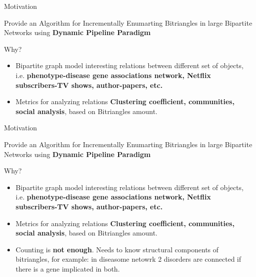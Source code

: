 \begin{frame}[fragile]{Motivation}
  \begin{center}
    Provide an Algorithm for Incrementally Enumarting Bitriangles in large Bipartite Networks using \textbf{Dynamic Pipeline Paradigm}
  \end{center}    
  \begin{block}{Why?}
    \begin{itemize}
      \item {\color{light}Bipartite graph model interesting relations between different set of objects, i.e. \textbf{phenotype-disease gene associations network, Netflix subscribers-TV shows, author-papers, etc.}}
      \item Metrics for analyzing relations \textbf{Clustering coefficient, communities, social analysis}, based on Bitriangles amount.
    \end{itemize}
  \end{block}
\end{frame}

\begin{frame}[fragile]{Motivation}
  \begin{center}
    Provide an Algorithm for Incrementally Enumarting Bitriangles in large Bipartite Networks using \textbf{Dynamic Pipeline Paradigm}
  \end{center}    
  \begin{block}{Why?}
    \begin{itemize}
      \item {\color{light}Bipartite graph model interesting relations between different set of objects, i.e. \textbf{phenotype-disease gene associations network, Netflix subscribers-TV shows, author-papers, etc.}}
      \item {\color{light}Metrics for analyzing relations \textbf{Clustering coefficient, communities, social analysis}, based on Bitriangles amount.}
      \item Counting is \textbf{not enough}. Needs to know structural components of bitriangles, for example: in diseasome netowrk 2 disorders are connected if there is a gene implicated in both. 
    \end{itemize}
  \end{block}
\end{frame}

